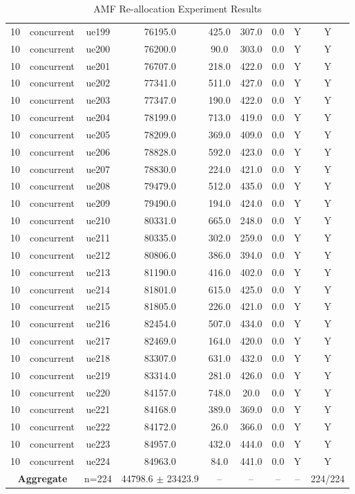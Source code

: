 \begin{table}[ht]
\begin{tabular}{|c|c|c|c|c|c|c|c|c|}
10 & concurrent & ue199 & 76195.0 & 425.0 & 307.0 & 0.0 & Y & Y \\
10 & concurrent & ue200 & 76200.0 & 90.0 & 303.0 & 0.0 & Y & Y \\
10 & concurrent & ue201 & 76707.0 & 218.0 & 422.0 & 0.0 & Y & Y \\
10 & concurrent & ue202 & 77341.0 & 511.0 & 427.0 & 0.0 & Y & Y \\
10 & concurrent & ue203 & 77347.0 & 190.0 & 422.0 & 0.0 & Y & Y \\
10 & concurrent & ue204 & 78199.0 & 713.0 & 419.0 & 0.0 & Y & Y \\
10 & concurrent & ue205 & 78209.0 & 369.0 & 409.0 & 0.0 & Y & Y \\
10 & concurrent & ue206 & 78828.0 & 592.0 & 423.0 & 0.0 & Y & Y \\
10 & concurrent & ue207 & 78830.0 & 224.0 & 421.0 & 0.0 & Y & Y \\
10 & concurrent & ue208 & 79479.0 & 512.0 & 435.0 & 0.0 & Y & Y \\
10 & concurrent & ue209 & 79490.0 & 194.0 & 424.0 & 0.0 & Y & Y \\
10 & concurrent & ue210 & 80331.0 & 665.0 & 248.0 & 0.0 & Y & Y \\
10 & concurrent & ue211 & 80335.0 & 302.0 & 259.0 & 0.0 & Y & Y \\
10 & concurrent & ue212 & 80806.0 & 386.0 & 394.0 & 0.0 & Y & Y \\
10 & concurrent & ue213 & 81190.0 & 416.0 & 402.0 & 0.0 & Y & Y \\
10 & concurrent & ue214 & 81801.0 & 615.0 & 425.0 & 0.0 & Y & Y \\
10 & concurrent & ue215 & 81805.0 & 226.0 & 421.0 & 0.0 & Y & Y \\
10 & concurrent & ue216 & 82454.0 & 507.0 & 434.0 & 0.0 & Y & Y \\
10 & concurrent & ue217 & 82469.0 & 164.0 & 420.0 & 0.0 & Y & Y \\
10 & concurrent & ue218 & 83307.0 & 631.0 & 432.0 & 0.0 & Y & Y \\
10 & concurrent & ue219 & 83314.0 & 281.0 & 426.0 & 0.0 & Y & Y \\
10 & concurrent & ue220 & 84157.0 & 748.0 & 20.0 & 0.0 & Y & Y \\
10 & concurrent & ue221 & 84168.0 & 389.0 & 369.0 & 0.0 & Y & Y \\
10 & concurrent & ue222 & 84172.0 & 26.0 & 366.0 & 0.0 & Y & Y \\
10 & concurrent & ue223 & 84957.0 & 432.0 & 444.0 & 0.0 & Y & Y \\
10 & concurrent & ue224 & 84963.0 & 84.0 & 441.0 & 0.0 & Y & Y \\
\multicolumn{2}{|c|}{\textbf{Aggregate}} & n=224 & 44798.6 $\pm$ 23423.9 & -- & -- & -- & -- & 224/224 \\
\hline
\end{tabular}
\caption{AMF Re-allocation Experiment Results}
\label{tab:amf_realloc}
\end{table}
